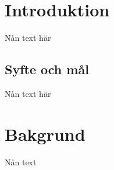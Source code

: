 \section{Introduktion}
Nån text här
\subsection{Syfte och mål}
Nån text här
\section{Bakgrund}
Nån text

